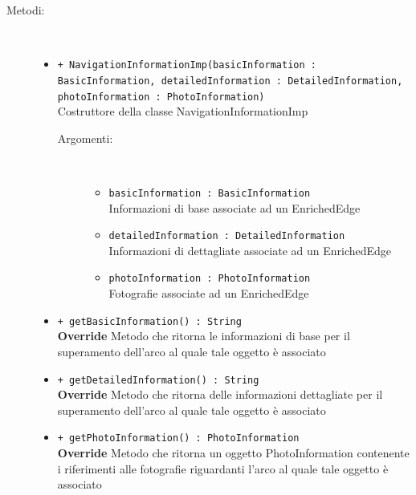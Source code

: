 \documentclass[../DefinizioneDiProdotto.tex]{subfiles}
\begin{document}
\begin{description}
\begin{itemize}
	\end{itemize}
	\item[Metodi:] \
	\begin{itemize}
		\item \texttt{+ NavigationInformationImp(basicInformation : BasicInformation, detailedInformation : DetailedInformation, photoInformation : PhotoInformation)}\\
		Costruttore della classe NavigationInformationImp
		\begin{description}
			\item[Argomenti:] \
			\begin{itemize}
				\item \texttt{basicInformation : BasicInformation}\\
				Informazioni di base associate ad un EnrichedEdge\item \texttt{detailedInformation : DetailedInformation}\\
				Informazioni di dettagliate associate ad un EnrichedEdge\item \texttt{photoInformation : PhotoInformation}\\
				Fotografie associate ad un EnrichedEdge\end{itemize}
		\end{description}
		\item \texttt{+ getBasicInformation() : String}\\
		\textbf{Override} Metodo che ritorna le informazioni di base per il superamento dell'arco al quale tale oggetto è associato
		\item \texttt{+ getDetailedInformation() : String}\\
		\textbf{Override} Metodo che ritorna delle informazioni dettagliate per il superamento dell'arco al quale tale oggetto è associato
		\item \texttt{+ getPhotoInformation() : PhotoInformation}\\
		\textbf{Override} Metodo che ritorna un oggetto PhotoInformation contenente i riferimenti alle fotografie riguardanti l'arco al quale tale oggetto è associato
	\end{itemize}
\end{description}
\end{document}
